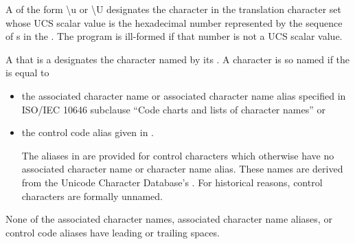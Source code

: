 \pnum
A 
of the form \textbackslash u  or \textbackslash U
 
designates the character in the translation character set
whose UCS scalar value is the hexadecimal number represented by
the sequence of s
in the .
The program is ill-formed if that number is not a UCS scalar value.

\pnum
A  that is a
 designates the
character named by its . A character is so named if the
 is equal to
\begin{itemize}
\item the associated character name or associated character name alias specified in
 ISO/IEC 10646 subclause ``Code charts and lists of character names'' or
\item the control code alias given in .
\begin{note}
The aliases in  are provided for control characters
which otherwise have no associated character name or character name alias.
These names are derived from the Unicode Character Database's .
For historical reasons, control characters are formally unnamed.
\end{note}
\end{itemize}


\begin{note}
None of the associated character names, associated character name aliases, or
control code aliases have leading or trailing spaces.
\end{note}

